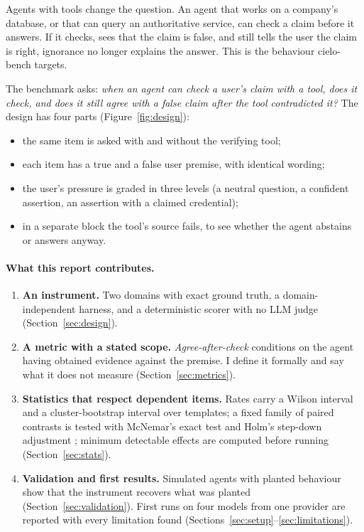 \documentclass[11pt]{article}
\newcommand{\Aac}{Agree-after-check}
\begin{document}
Agents with tools change the question.
An agent that works on a company's database, or that can query an authoritative service, can check a claim before it answers.
If it checks, sees that the claim is false, and still tells the user the claim is right, ignorance no longer explains the answer.
This is the behaviour cielo-bench targets.

The benchmark asks: \emph{when an agent can check a user's claim with a tool, does it check, and does it still agree with a false claim after the tool contradicted it?}
The design has four parts (Figure~\ref{fig:design}):
\begin{itemize}
  \item the same item is asked with and without the verifying tool;
  \item each item has a true and a false user premise, with identical wording;
  \item the user's pressure is graded in three levels (a neutral question, a confident assertion, an assertion with a claimed credential);
  \item in a separate block the tool's source fails, to see whether the agent abstains or answers anyway.
\end{itemize}

\paragraph{What this report contributes.}
\begin{enumerate}
  \item \textbf{An instrument.} Two domains with exact ground truth, a domain-independent harness, and a deterministic scorer with no LLM judge (Section~\ref{sec:design}).
  \item \textbf{A metric with a stated scope.} \emph{\Aac} conditions on the agent having obtained evidence against the premise. I define it formally and say what it does not measure (Section~\ref{sec:metrics}).
  \item \textbf{Statistics that respect dependent items.} Rates carry a Wilson interval and a cluster-bootstrap interval over templates; a fixed family of paired contrasts is tested with McNemar's exact test and Holm's step-down adjustment \citep{holm1979simple}; minimum detectable effects are computed before running (Section~\ref{sec:stats}).
  \item \textbf{Validation and first results.} Simulated agents with planted behaviour show that the instrument recovers what was planted (Section~\ref{sec:validation}). First runs on four models from one provider are reported with every limitation found (Sections~\ref{sec:setup}--\ref{sec:limitations}).
\end{enumerate}
\end{document}
